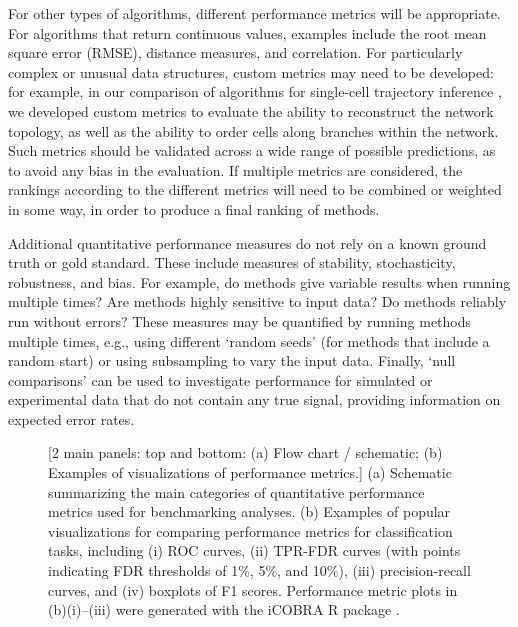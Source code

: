 \documentclass[12pt, a4paper]{article}
\begin{document}
For other types of algorithms, different performance metrics will be appropriate. For algorithms that return continuous values, examples include the root mean square error (RMSE), distance measures, and correlation. For particularly complex or unusual data structures, custom metrics may need to be developed: for example, in our comparison of algorithms for single-cell trajectory inference \citep{Saelens2018b}, we developed custom metrics to evaluate the ability to reconstruct the network topology, as well as the ability to order cells along branches within the network. Such metrics should be validated across a wide range of possible predictions, as to avoid any bias in the evaluation. If multiple metrics are considered, the rankings according to the different metrics will need to be combined or weighted in some way, in order to produce a final ranking of methods.

Additional quantitative performance measures do not rely on a known ground truth or gold standard. These include measures of stability, stochasticity, robustness, and bias. For example, do methods give variable results when running multiple times? Are methods highly sensitive to input data? Do methods reliably run without errors? These measures may be quantified by running methods multiple times, e.g., using different `random seeds' (for methods that include a random start) or using subsampling to vary the input data. Finally, `null comparisons' can be used to investigate performance for simulated or experimental data that do not contain any true signal, providing information on expected error rates.



\vskip 5mm

\begin{figure}[H]
\begin{center}
\end{center}
\caption{[2 main panels: top and bottom: (a) Flow chart / schematic; (b) Examples of visualizations of performance metrics.] (a) Schematic summarizing the main categories of quantitative performance metrics used for benchmarking analyses. (b) Examples of popular visualizations for comparing performance metrics for classification tasks, including (i) ROC curves, (ii) TPR-FDR curves (with points indicating FDR thresholds of 1\%, 5\%, and 10\%), (iii) precision-recall curves, and (iv) boxplots of F1 scores. Performance metric plots in (b)(i)--(iii) were generated with the iCOBRA R package \citep{Soneson2016}.}
\label{fig:performance_metrics}
\end{figure}
\end{document}

